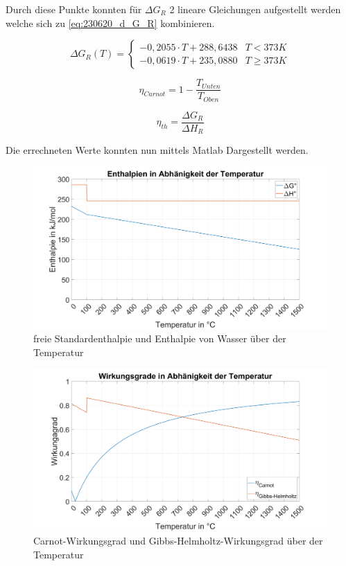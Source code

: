 Durch diese Punkte konnten für $\Delta G_R$ 2 lineare Gleichungen aufgestellt werden welche sich zu \autoref{eq:230620_d_G_R} kombinieren.

\begin{equation}
    \Delta G_R(T) =
    \begin{cases}
        -0,2055 \cdot T + 288,6438 & T < 373 K \\
        -0,0619 \cdot T + 235,0880 & T \geq 373 K
    \end{cases}
    \label{eq:230620_d_G_R}
\end{equation}

\begin{equation}
    \eta_{Carnot} = 1 - \frac{T_{Unten}}{T_{Oben}}
    \label{eq:230620_Carnot}
\end{equation}

\begin{equation}
    \eta_{th} = \frac{\Delta G_R}{\Delta H_R}
    \label{eq:230620_Gibbs-Helmholtz}
\end{equation}

Die errechneten Werte konnten nun mittels Matlab Dargestellt werden.

\begin{figure}[H]
    \centering
    \includegraphics[width=\textwidth]{Abbildungen/Enthalpien.png}
    \caption{freie Standardenthalpie und Enthalpie von Wasser über der Temperatur}
    \label{fig:230620_Enthalpie}
\end{figure}

\begin{figure}[H]
    \centering
    \includegraphics[width=\textwidth]{Abbildungen/Wirkungsgrade.png}
    \caption{Carnot-Wirkungsgrad und Gibbs-Helmholtz-Wirkungsgrad über der Temperatur}
    \label{fig:230620_Wirkungsgrade}
\end{figure}

